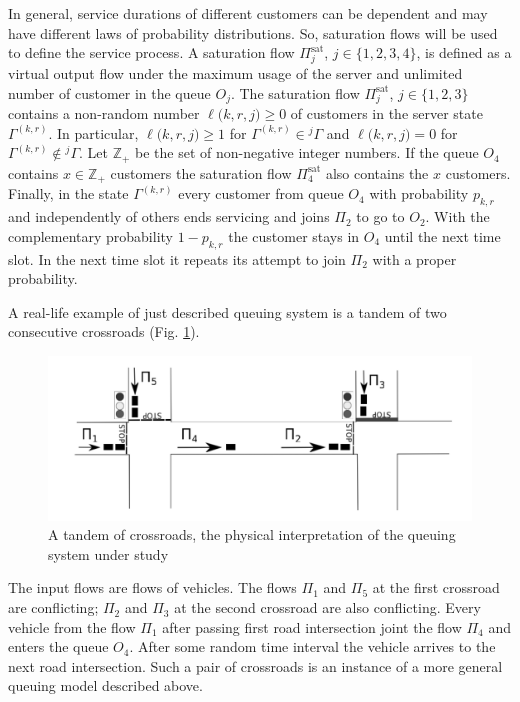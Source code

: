 \documentclass[10pt]{article}
\begin{document}
In general, service durations of different customers can be dependent and may have different laws of
probability distributions. So, saturation flows will be used to define the service process. A
saturation flow $\Pi^{\mathrm{\text{sat}}}_j$, $j \in \{1,2,3,4\}$, is defined as a virtual output
flow under the maximum usage of the server and unlimited number of customer in the queue $O_j$. The
saturation flow $\Pi^{\mathrm{\text{sat}}}_j$, $j\in \{1,2,3\}$ contains a non-random number
$\ell({k,r,j)}\geqslant0$ of customers in the server state $\Gamma^{(k,r)}$. In particular,
$\ell({k,r,j)}\geqslant1$ for $\Gamma^{(k,r)}\in{}^j\Gamma$ and $\ell({k,r,j)}=0$ for
$\Gamma^{(k,r)}\not\in{}^j\Gamma$. Let $\mathbb{Z}_+$ be
the set of non-negative integer numbers. If the queue $O_4$ contains $x \in \mathbb{Z}_+$ customers
the saturation flow $\Pi^{\mathrm{\text{sat}}}_4$ also contains the $x$ customers.  Finally, in the
state $\Gamma^{(k,r)}$ every customer from queue $O_4$ with probability $p_{k,r}$ and independently
of others ends servicing and joins $\Pi_2$ to go to $O_2$. With the complementary probability
$1-p_{k,r}$ the customer stays in $O_4$ until the next time slot. In the next time slot it repeats
its attempt to join $\Pi_2$ with a proper probability.

A real-life example of just described queuing system is a tandem of two consecutive crossroads
(Fig. \ref{crossroads}).
\begin{figure}[h!]
   \centering
    \includegraphics[width=\textwidth]{Crossroads.pdf} 
    \caption {A tandem of crossroads, the physical interpretation of the queuing system under study}
    \label{crossroads}
\end{figure}
The input flows are flows of vehicles. The flows $\Pi_1$ and $\Pi_5$ at the first crossroad are
conflicting; $\Pi_2$ and $\Pi_3$ at the second crossroad are also conflicting. Every vehicle from
the flow $\Pi_1$ after passing first road intersection joint the flow $\Pi_4$ and enters the queue
$O_4$. After some random time interval the vehicle arrives to the next road intersection. Such a pair
of crossroads is an instance of a more general queuing model described above.
\end{document}

